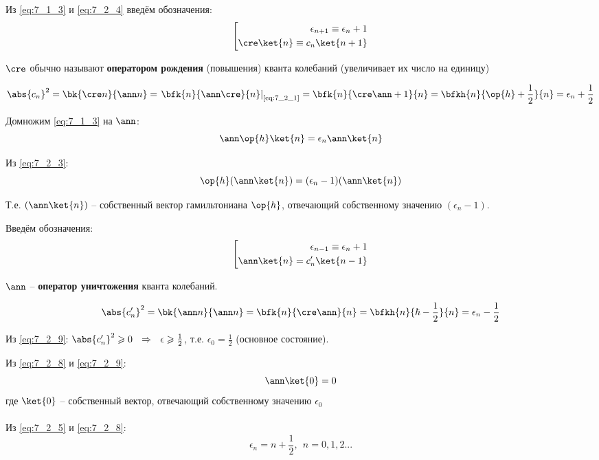 Из \eqref{eq:7_1_3} и \eqref{eq:7_2_4} введём обозначения:
\begin{equation}
\label{eq:7_2_5}
\left[
\begin{aligned}
\epsilon_{n+1} \equiv \epsilon_n + 1 \\
\cre \ket{n} \equiv c_n \ket{n+1}
\end{aligned}
\right.
\end{equation}

$\cre$ обычно называют \textbf{оператором рождения} (повышения) кванта колебаний (увеличивает их число на единицу)

\begin{equation}
\label{eq:7_2_6}
\abs{c_n}^2 = \bk{\cre n}{\ann n} = \left. \bfk{n}{\ann\cre}{n} \right|_{\text{\eqref{eq:7_2_1}}} = \bfk{n}{\cre\ann + 1}{n} = \bfkh{n}{\op{h} + \frac{1}{2}}{n} = \epsilon_n + \frac{1}{2}
\end{equation}

Домножим \eqref{eq:7_1_3} на $\ann$:
$$
\ann\op{h} \ket{n} = \epsilon_n \ann \ket{n}
$$

Из \eqref{eq:7_2_3}:
\begin{equation}
\label{eq:7_2_7}
\op{h}(\ann\ket{n}) = (\epsilon_n - 1)(\ann \ket{n})
\end{equation}

Т.е. $(\ann\ket{n})$ -- собственный вектор гамильтониана $\op{h}$, отвечающий собственному значению $(\epsilon_n - 1)$.

Введём обозначения:
\begin{equation}
\label{eq:7_2_8}
\left[
\begin{aligned}
\epsilon_{n-1} \equiv \epsilon_n + 1 \\
\ann \ket{n} = c_{n}' \ket{n-1}
\end{aligned}
\right.
\end{equation}

$\ann$ -- \textbf{оператор уничтожения} кванта колебаний.

\begin{equation}
\label{eq:7_2_9}
\abs{c_n'}^2 = \bk{\ann n}{\ann n} = \bfk{n}{\cre\ann}{n} = \bfkh{n}{\hbar - \frac{1}{2}}{n} = \epsilon_n - \frac{1}{2}
\end{equation}

Из \eqref{eq:7_2_9}: $\abs{c_n'}^2 \geqslant 0 ~~\Rightarrow~~ \epsilon \geqslant \frac{1}{2}$, т.е. $\epsilon_0 = \frac{1}{2}$ (основное состояние).

Из \eqref{eq:7_2_8} и \eqref{eq:7_2_9}:
$$
	\ann \ket{0} = 0
$$
где $\ket{0}$ -- собственный вектор, отвечающий собственному значению $\epsilon_0$\\
\\
Из \eqref{eq:7_2_5} и \eqref{eq:7_2_8}: 
\begin{equation}
\label{eq:7_2_10}
\epsilon_n = n + \frac{1}{2},~~ n = 0,1,2...
\end{equation}

